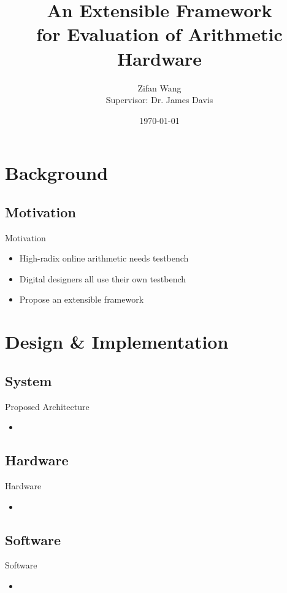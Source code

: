 \documentclass{beamer}
\title[AEFfEoAH]{An Extensible Framework\\for Evaluation of Arithmetic Hardware}
\subtitle{}
\author[Zifan Wang]{Zifan Wang \texorpdfstring{\\}{} Supervisor: Dr. James Davis}
\institute[]{Imperial College London}
\date{\today}
\begin{document}
\begin{frame}
  \titlepage
\end{frame}

\begin{frame}
  \tableofcontents
\end{frame}

\section{Background}
\subsection{Motivation}
\begin{frame}{Motivation}
  \begin{itemize}
  \item High-radix online arithmetic needs testbench
  \item Digital designers all use their own testbench
  \item Propose an extensible framework
\end{itemize}
\end{frame}

\section{Design \& Implementation}
\subsection{System}
\begin{frame}{Proposed Architecture}
\begin{itemize}
  \item 
\end{itemize}
\end{frame}

\subsection{Hardware}
\begin{frame}{Hardware}
\begin{itemize}
  \item 
\end{itemize}
\end{frame}

\subsection{Software}
\begin{frame}{Software}
\begin{itemize}
  \item 
\end{itemize}
\end{frame}
\end{document}
